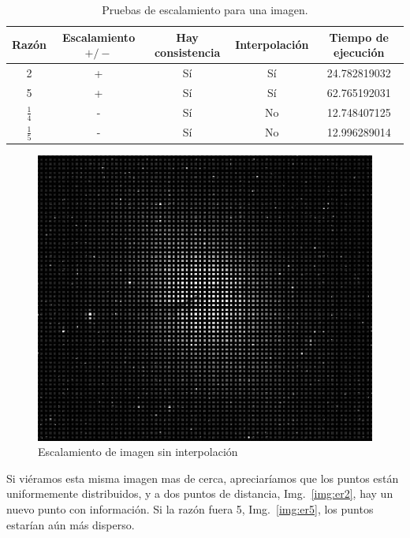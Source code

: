 \begin{table}[ht!]
	\centering
	\begin{tabular}{c|c|c|c|c}
		Razón & Escalamiento $+ / - $ & Hay consistencia & Interpolación & Tiempo de ejecución \\\hline\hline
		2             & + & Sí & Sí & 24.782819032 \\\hline
		5             & + & Sí & Sí & 62.765192031 \\\hline
		$\frac{1}{4}$ & - & Sí & No & 12.748407125 \\\hline
		$\frac{1}{5}$ & - & Sí & No & 12.996289014 \\
	\end{tabular}
	\caption{Pruebas de escalamiento para una imagen.}
	\label{tab:pei}
\end{table}

\begin{figure}[ht!]
	\centering
	\includegraphics[scale=.5]{img/esi}
	\caption{Escalamiento de imagen sin interpolación}
	\label{img:esi}
\end{figure}

Si viéramos esta misma imagen mas de cerca, apreciaríamos que los puntos están uniformemente distribuidos, y a dos puntos de distancia, Img.~\ref{img:er2}, hay un nuevo punto con información. Si la razón fuera 5, Img.~\ref{img:er5}, los puntos estarían aún más disperso.

